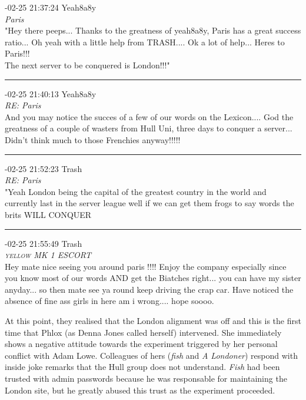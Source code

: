 \begin{mail}

{-02-25 21:37:24 Yeah8a8y}\\
{\itshape Paris}\\
"Hey there peeps... Thanks to the greatness of yeah8a8y, Paris has a great success ratio... Oh yeah with a little help from TRASH.... Ok a lot of help... Heres to Paris!!!\\
The next server to be conquered is London!!!"\\

\rule{0.8\textwidth}{.4pt}

{-02-25 21:40:13 Yeah8a8y}\\
{\itshape RE: Paris}\\
And you may notice the succes of a few of our words on the Lexicon.... God the greatness of a couple of wasters from Hull Uni, three days to conquer a server... Didn't think much to those Frenchies anyway!!!!!\\

\rule{0.8\textwidth}{.4pt}

{-02-25 21:52:23 Trash}\\
{\itshape RE: Paris}\\
"Yeah London being the capital of the greatest country in the world and currently last in the server league well if we can get them frogs to say words the brits WILL CONQUER\\

\rule{0.8\textwidth}{.4pt}

{-02-25 21:55:49 Trash}\\
{\itshape \textsc{yellow} MK 1 ESCORT}\\
Hey mate nice seeing you around paris !!!! Enjoy the company especially since you know most of our words AND get the Biatches right... you can have my sister anyday... so then mate see ya round keep driving the crap car.	
Have noticed the absence of fine ass girls in here am i wrong.... hope soooo.
\end{mail}

At this point, they realised that the London alignment was off and this is the first time that Phlox (as Denna 
Jones called herself) intervened. She immediately shows
a negative attitude towards the experiment triggered by her personal conflict with Adam Lowe. 
Colleagues of hers ({\it fish} and {\it A Londoner}) respond with inside joke
remarks that the Hull group does not understand. {\it Fish} had been trusted with admin passwords because he
was responsable for maintaining the London site, but he greatly abused this trust as the experiment proceeded. 

